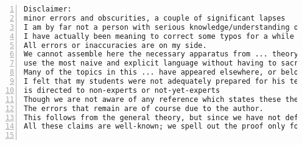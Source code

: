 \documentclass[11pt]{amsart}
\begin{document}
\begin{lstlisting}[numbers=left,numberstyle=\tiny,numbersep=10pt]
Disclaimer:
minor errors and obscurities, a couple of significant lapses
I am by far not a person with serious knowledge/understanding of ..., thus in the ... I may oversimplify/overcomplicate things, be inaccurate, or even wrong, and miss subtelties.
I have actually been meaning to correct some typos for a while and so I will hopefully do all these corrections in the next few weeks.
All errors or inaccuracies are on my side.
We cannot assemble here the necessary apparatus from ... theory.
use the most naive and explicit language without having to sacrifice any essential ideas
Many of the topics in this ... have appeared elsewhere, or belong to the mathematical folklore; it should not be assumed that uncredited results are due to the author.
I felt that my students were not adequately prepared for his text, and I wrote my notes with the hope to provide this preparation.
is directed to non-experts or not-yet-experts
Though we are not aware of any reference which states these theorems in the generality which we consider, these theorems should be considered well known.
The errors that remain are of course due to the author.
This follows from the general theory, but since we have not defined ..., we are merely stating this as a fact.
All these claims are well-known; we spell out the proof only for the reader's convenience.


\end{lstlisting}
\end{document}
